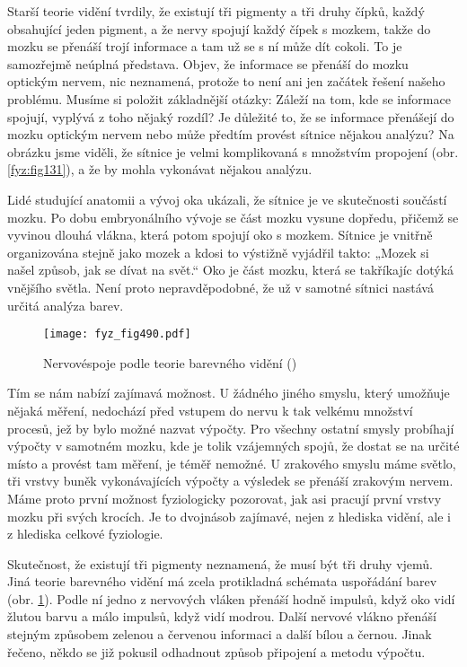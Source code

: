    Starší teorie vidění tvrdily, že existují tři pigmenty a tři druhy čípků, každý obsahující jeden
    pigment, a že nervy spojují každý čípek s mozkem, takže do mozku se přenáší trojí informace a
    tam už se s ní může dít cokoli. To je samozřejmě neúplná představa. Objev, že informace se
    přenáší do mozku optickým nervem, nic neznamená, protože to není ani jen začátek řešení našeho
    problému. Musíme si položit základnější otázky: Záleží na tom, kde se informace spojují, vyplývá
    z toho nějaký rozdíl? Je důležité to, že se informace přenášejí do mozku optickým nervem nebo
    může předtím provést sítnice nějakou analýzu? Na obrázku jsme viděli, že sítnice je velmi
    komplikovaná s množstvím propojení (obr. \ref {fyz:fig131}), a že by mohla vykonávat nějakou
    analýzu.
    
    Lidé studující anatomii a vývoj oka ukázali, že sítnice je ve skutečnosti součástí mozku. Po
    dobu embryonálního vývoje se část mozku vysune dopředu, přičemž se vyvinou dlouhá vlákna, která
    potom spojují oko s mozkem. Sítnice je vnitřně organizována stejně jako mozek a kdosi to
    výstižně vyjádřil takto: „Mozek si našel způsob, jak se dívat na svět.“ Oko je část mozku, která
    se takříkajíc dotýká vnějšího světla. Není proto nepravděpodobné, že už v samotné sítnici
    nastává určitá analýza barev.

    \begin{figure}[ht!] %
      \centering
      \texttt{[image: fyz\_fig490.pdf]}
      \caption{Nervovéspoje podle  teorie barevného vidění (\cite[s.~697]{Feynman01})}
      \label{fyz:fig490}
    \end{figure}

    Tím se nám nabízí zajímavá možnost. U žádného jiného smyslu, který umožňuje nějaká měření,
    nedochází před vstupem do nervu k tak velkému množství procesů, jež by bylo možné nazvat
    výpočty. Pro všechny ostatní smysly probíhají výpočty v samotném mozku, kde je tolik vzájemných
    spojů, že dostat se na určité místo a provést tam měření, je téměř nemožné. U zrakového smyslu
    máme světlo, tři vrstvy buněk vykonávajících výpočty a výsledek se přenáší zrakovým nervem. Máme
    proto první možnost fyziologicky pozorovat, jak asi pracují první vrstvy mozku při svých
    krocích. Je to dvojnásob zajímavé, nejen z hlediska vidění, ale i z hlediska celkové fyziologie.

    Skutečnost, že existují tři pigmenty neznamená, že musí být tři druhy vjemů. Jiná teorie
    barevného vidění má zcela protikladná schémata uspořádání barev (obr. \ref{fyz:fig490}). Podle
    ní jedno z nervových vláken přenáší hodně impulsů, když oko vidí žlutou barvu a málo impulsů,
    když vidí modrou. Další nervové vlákno přenáší stejným způsobem zelenou a červenou informaci a
    další bílou a černou. Jinak řečeno, někdo se již pokusil odhadnout způsob připojení a metodu
    výpočtu.

